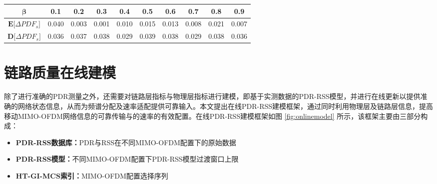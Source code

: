 \begin{table}[!htp]
\renewcommand{\arraystretch}{1}
\centering
\begin{threeparttable}[b]
\label{error}
\begin{tabular}{c|ccccccccc}
\hline
$\pmb{\beta}$ & 0.1   & 0.2   & 0.3   & 0.4   & 0.5   & 0.6   & 0.7   & 0.8   & 0.9 \\
\hline
$\textbf{E[}\Delta PDF_s\textbf{]}$ & 0.040 & 0.003 & 0.001 & 0.010 & 0.015 & 0.013 & 0.008 & 0.021 & 0.007 \\
$\textbf{D[}\Delta PDF_s\textbf{]}$ & 0.036 & 0.037 & 0.038 & 0.029 & 0.039 & 0.038 & 0.029 & 0.038 & 0.036 \\
\hline
\end{tabular}
\end{threeparttable}
\end{table}

\begin{figure}[!htp]
\centering
{}
    \hspace{1cm}
\hspace{1in}
\centering
{}
    \hspace{1cm}
\end{figure}
%

\section{链路质量在线建模}
\label{sec:modeling}

除了进行准确的PDR测量之外，还需要对链路层指标与物理层指标进行建模，即基于实测数据的PDR-RSS模型，并进行在线更新以提供准确的网络状态信息，从而为频谱分配及速率适配提供可靠输入。本文提出在线PDR-RSS建模框架，通过同时利用物理层及链路层信息，提高移动MIMO-OFDM网络信息的可靠传输与的速率的有效配置。在线PDR-RSS建模框架如图 \ref{fig:onlinemodel} 所示，该框架主要由三部分构成：
\begin{itemize}
  \item \textbf{PDR-RSS数据库：}PDR与RSS在不同MIMO-OFDM配置下的原始数据
  \item \textbf{PDR-RSS模型：}不同MIMO-OFDM配置下PDR-RSS模型过渡窗口上限
  \item \textbf{HT-GI-MCS索引：}MIMO-OFDM配置选择序列
\end{itemize}

